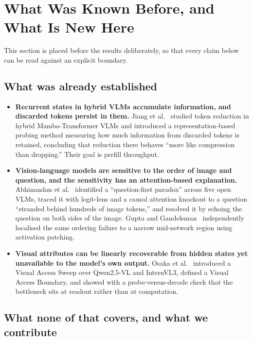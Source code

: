 \documentclass[11pt]{article}
\begin{document}
\section{What Was Known Before, and What Is New Here}
\label{sec:novelty}

This section is placed before the results deliberately, so that every claim
below can be read against an explicit boundary.

\subsection*{What was already established}

\begin{itemize}\itemsep2pt
\item \textbf{Recurrent states in hybrid VLMs accumulate information, and
discarded tokens persist in them.} Jiang et al.~\cite{jiang2026stateful}
studied token reduction in hybrid Mamba-Transformer VLMs and introduced a
representation-based probing method measuring how much information from
discarded tokens is retained, concluding that reduction there behaves ``more
like compression than dropping.'' Their goal is prefill throughput.
\item \textbf{Vision-language models are sensitive to the order of image and
question, and the sensitivity has an attention-based explanation.}
Abhinandan et al.~\cite{abhinandan2026asktwice} identified a ``question-first
paradox'' across five open VLMs, traced it with logit-lens and a causal
attention knockout to a question ``stranded behind hundreds of image tokens,''
and resolved it by echoing the question on both sides of the image. Gupta and
Gandelsman~\cite{gupta2026modality} independently localised the same ordering
failure to a narrow mid-network region using activation patching.
\item \textbf{Visual attributes can be linearly recoverable from hidden states
yet unavailable to the model's own output.} Osaka et al.~\cite{osaka2026vab}
introduced a Visual Access Sweep over Qwen2.5-VL and InternVL3, defined a
Visual Access Boundary, and showed with a probe-versus-decode check that the
bottleneck sits at readout rather than at computation.
\end{itemize}

\subsection*{What none of that covers, and what we contribute}
\end{document}
